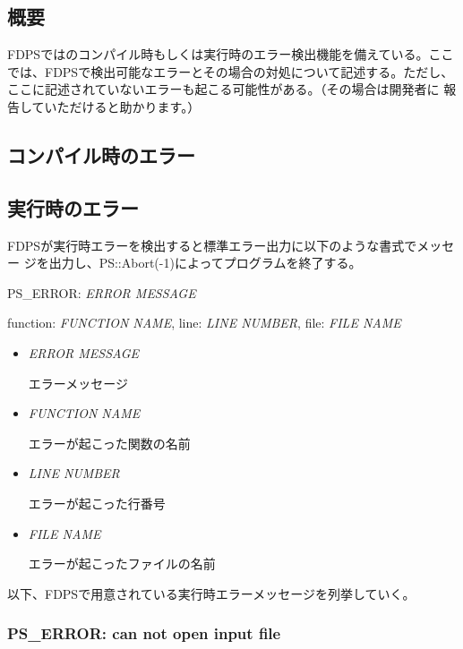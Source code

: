 \subsection{概要}

FDPSではのコンパイル時もしくは実行時のエラー検出機能を備えている。ここ
では、FDPSで検出可能なエラーとその場合の対処について記述する。ただし、
ここに記述されていないエラーも起こる可能性がある。（その場合は開発者に
報告していただけると助かります。）

\subsection{コンパイル時のエラー}

\subsection{実行時のエラー}

FDPSが実行時エラーを検出すると標準エラー出力に以下のような書式でメッセー
ジを出力し、PS::Abort(-1)によってプログラムを終了する。

\begin{screen}
  PS\_ERROR: \textit{ERROR MESSAGE}
  
  function: \textit{FUNCTION NAME}, line: \textit{LINE NUMBER}, file:
  \textit{FILE NAME}
\end{screen}

\begin{itemize}
\item \textit{ERROR MESSAGE}

  エラーメッセージ

\item \textit{FUNCTION NAME}

  エラーが起こった関数の名前

\item \textit{LINE NUMBER}

  エラーが起こった行番号
  
\item \textit{FILE NAME}

  エラーが起こったファイルの名前
    
\end{itemize}

以下、FDPSで用意されている実行時エラーメッセージを列挙していく。

\subsubsection{PS\_ERROR: can not open input file}

